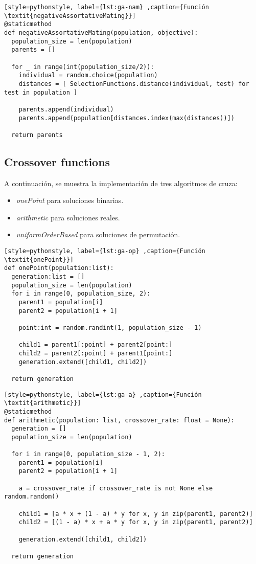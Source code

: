 \begin{lstlisting}[style=pythonstyle, label={lst:ga-nam} ,caption={Función  \textit{negativeAssortativeMating}}]
@staticmethod
def negativeAssortativeMating(population, objective):
  population_size = len(population)
  parents = []

  for _ in range(int(population_size/2)):
    individual = random.choice(population)
    distances = [ SelectionFunctions.distance(individual, test) for test in population ]

    parents.append(individual)
    parents.append(population[distances.index(max(distances))])

  return parents
\end{lstlisting}

\subsection{Crossover functions}

A continuación, se muestra la implementación de tres algoritmos de cruza:
\begin{itemize}
	\item \textit{onePoint} para soluciones binarias.
	\item \textit{arithmetic} para soluciones reales.
	\item \textit{uniformOrderBased} para soluciones de permutación.
\end{itemize}

\begin{lstlisting}[style=pythonstyle, label={lst:ga-op} ,caption={Función  \textit{onePoint}}]
def onePoint(population:list):
  generation:list = []    
  population_size = len(population)
  for i in range(0, population_size, 2):
    parent1 = population[i]
    parent2 = population[i + 1]

    point:int = random.randint(1, population_size - 1)

    child1 = parent1[:point] + parent2[point:]
    child2 = parent2[:point] + parent1[point:]
    generation.extend([child1, child2])

  return generation
\end{lstlisting}

\begin{lstlisting}[style=pythonstyle, label={lst:ga-a} ,caption={Función  \textit{arithmetic}}]
@staticmethod
def arithmetic(population: list, crossover_rate: float = None):
  generation = []
  population_size = len(population)

  for i in range(0, population_size - 1, 2):
    parent1 = population[i]
    parent2 = population[i + 1]

    a = crossover_rate if crossover_rate is not None else random.random()

    child1 = [a * x + (1 - a) * y for x, y in zip(parent1, parent2)]
    child2 = [(1 - a) * x + a * y for x, y in zip(parent1, parent2)]

    generation.extend([child1, child2])

  return generation
\end{lstlisting}

